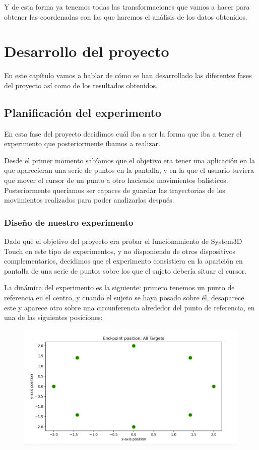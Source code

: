 \documentclass[a4paper,11pt, oneside]{book}
\begin{document}
Y de esta forma ya tenemos todas las transformaciones que vamos a hacer para obtener las coordenadas con las que haremos el análisis de los datos obtenidos.


\chapter{Desarrollo del proyecto}




En este capítulo vamos a hablar de cómo se han desarrollado las diferentes fases del proyecto así como de los resultados obtenidos.

\section{Planificación del experimento}

En esta fase del proyecto decidimos cuál iba a ser la forma que iba a tener el experimento que posteriormente íbamos a realizar.

Desde el primer momento sabíamos que el objetivo era tener una aplicación en la que aparecieran una serie de puntos en la pantalla, y en la que el usuario tuviera que mover el cursor de un punto a otro haciendo movimientos balísticos. Posteriormente queríamos ser capaces de guardar las trayectorias de los movimientos realizados para poder analizarlas después.



\subsection{Diseño de nuestro experimento}

Dado que el objetivo del proyecto era probar el funcionamiento de System3D Touch en este tipo de experimentos, y no disponiendo de otros dispositivos complementarios, decidimos que el experimento consistiera en la aparición en pantalla de una serie de puntos sobre los que el sujeto debería situar el cursor.

La dinámica del experimento es la siguiente: primero tenemos un punto de referencia en el centro, y cuando el sujeto se haya posado sobre él, desaparece este y aparece otro sobre una circunferencia alrededor del punto de referencia, en una de las siguientes posiciones:
\begin{figure}[H]
	
	\centering
	\includegraphics[width=0.6\linewidth]{points}
	\label{fig:figura1}
	
\end{figure}
\end{document}
